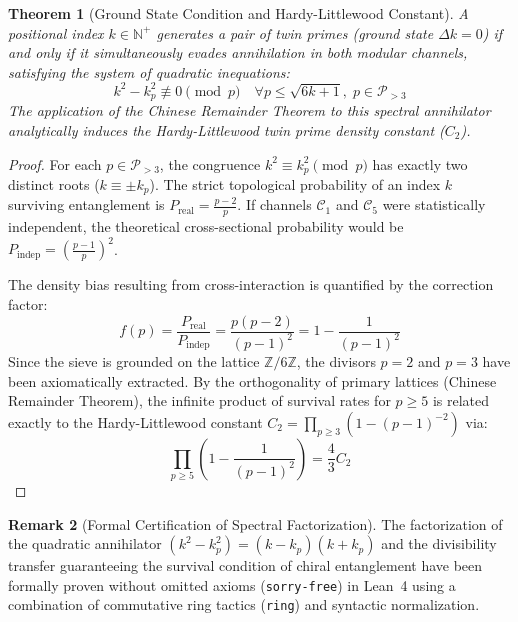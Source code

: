\documentclass{article}
\numberwithin{equation}{section}
\theoremstyle{plain}
\newtheorem{theorem}{Theorem}[section]
\theoremstyle{definition}
\newtheorem{remark}[theorem]{Remark}
\begin{document}
\begin{theorem}[Ground State Condition and Hardy-Littlewood Constant]
\label{thm:hardy-littlewood-kmin}
A positional index $k \in \mathbb{N}^+$ generates a pair of twin primes (ground state $\Delta k = 0$) if and only if it simultaneously evades annihilation in both modular channels, satisfying the system of quadratic inequations:
\begin{equation}
k^2 - k_p^2 \not\equiv 0 \pmod p \quad \forall p \le \sqrt{6k+1}, \; p \in \mathcal{P}_{>3}
\end{equation}
The application of the Chinese Remainder Theorem to this spectral annihilator analytically induces the Hardy-Littlewood twin prime density constant ($C_2$).
\end{theorem}

\begin{proof}
For each $p \in \mathcal{P}_{>3}$, the congruence $k^2 \equiv k_p^2 \pmod p$ has exactly two distinct roots ($k \equiv \pm k_p$). The strict topological probability of an index $k$ surviving entanglement is $P_{\text{real}} = \frac{p-2}{p}$. If channels $\mathcal{C}_1$ and $\mathcal{C}_5$ were statistically independent, the theoretical cross-sectional probability would be $P_{\text{indep}} = \left(\frac{p-1}{p}\right)^2$.

The density bias resulting from cross-interaction is quantified by the correction factor:
\begin{equation}
f(p) = \frac{P_{\text{real}}}{P_{\text{indep}}} = \frac{p(p-2)}{(p-1)^2} = 1 - \frac{1}{(p-1)^2}
\end{equation}
Since the sieve is grounded on the lattice $\mathbb{Z}/6\mathbb{Z}$, the divisors $p=2$ and $p=3$ have been axiomatically extracted. By the orthogonality of primary lattices (Chinese Remainder Theorem), the infinite product of survival rates for $p \ge 5$ is related exactly to the Hardy-Littlewood constant $C_2 = \prod_{p \ge 3} (1 - (p-1)^{-2})$ via:
\begin{equation}
\prod_{p \ge 5} \left( 1 - \frac{1}{(p-1)^2} \right) = \frac{4}{3} C_2
\end{equation}
\end{proof}

\begin{remark}[Formal Certification of Spectral Factorization]
\label{rem:certificacion-hardy-littlewood}
The factorization of the quadratic annihilator $(k^2 - k_p^2) = (k - k_p)(k + k_p)$ and the divisibility transfer guaranteeing the survival condition of chiral entanglement have been formally proven without omitted axioms (\texttt{sorry-free}) in Lean~4 using a combination of commutative ring tactics (\texttt{ring}) and syntactic normalization.
\end{remark}
\end{document}
